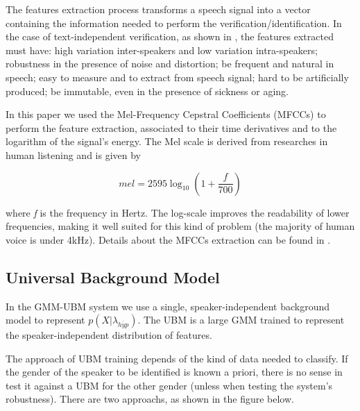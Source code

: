 \documentclass[a4paper,twocolumn]{article}
\begin{document}
The features extraction process transforms a speech signal into a vector containing the information needed to perform the verification/identification. In the case of text-independent verification, as shown in \cite{pinheiro_2013}, the features extracted must have: high variation inter-speakers and low variation intra-speakers; robustness in the presence of noise and distortion; be frequent and natural in speech; easy to measure and to extract from speech signal; hard to be artificially produced; be immutable, even in the presence of sickness or aging.

In this paper we used the Mel-Frequency Cepstral Coefficients (MFCCs) \cite{davis_mermelstein_1980} to perform the feature extraction, associated to their time derivatives and to the logarithm of the signal's energy. The Mel scale is derived from researches in human listening and is given by

\begin{equation}
    \label{eq:hertz_to_mel}
    mel = 2595\log_{10} (1 + \frac{f}{700})
\end{equation}

\noindent where \textit{f} is the frequency in Hertz. The log-scale improves the readability of lower frequencies, making it well suited for this kind of problem (the majority of human voice is under 4kHz). Details about the MFCCs extraction can be found in \cite{pinheiro_2013}.

\subsection{Universal Background Model}

In the GMM-UBM system we use a single, speaker-independent background model to represent $p(X|\lambda_{\overline{hyp}})$. The UBM is a large GMM trained to represent the speaker-independent distribution of features.

The approach of UBM training depends of the kind of data needed to classify. If the gender of the speaker to be identified is known a priori, there is no sense in test it against a UBM for the other gender (unless when testing the system's robustness). There are two approachs, as shown in the figure below.
\end{document}
